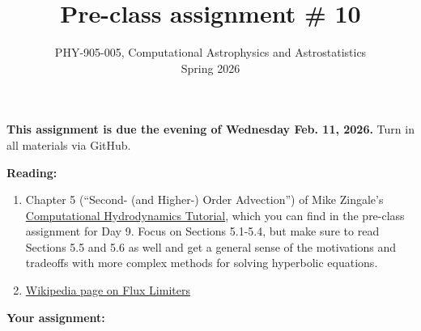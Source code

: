 \documentclass[10pt]{article}
\title{Pre-class assignment \# 10}
\author{PHY-905-005, Computational Astrophysics and
  Astrostatistics\\Spring 2026}
\date{} %
\begin{document}
 
\maketitle

\vspace{-5mm}

\noindent
\textbf{This assignment is due the evening of Wednesday Feb. 11, 2026.}
 Turn in all materials via GitHub.

\vspace{5mm}

\noindent
\textbf{Reading:}

\begin{enumerate}

\item Chapter 5 (``Second- (and Higher-) Order Advection'') of Mike Zingale's
\href{https://open-astrophysics-bookshelf.github.io/numerical_exercises/CompHydroTutorial.pdf}{Computational
Hydrodynamics Tutorial}, which you can find in the pre-class assignment for Day 9.
Focus on Sections 5.1-5.4, but make sure to read Sections 5.5 and 5.6 as well and get a
general sense of the motivations and tradeoffs with more complex
methods for solving hyperbolic equations.

\item \href{https://en.wikipedia.org/wiki/Flux_limiter}{Wikipedia page
    on Flux Limiters}

\end{enumerate}

\noindent
\textbf{Your assignment:}  
\end{document}
